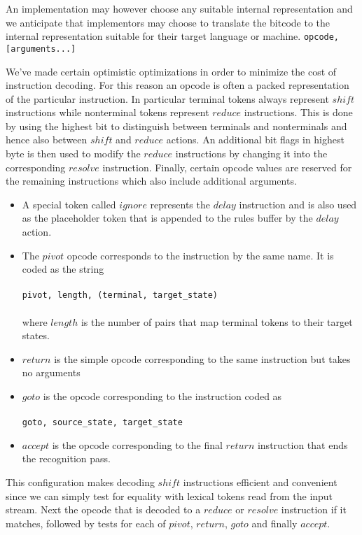 \documentclass[11pt]{article}
\begin{document}
An implementation may however choose any suitable internal representation and we anticipate that implementors may choose to translate the bitcode to the internal representation suitable for their target language or machine.
\texttt{opcode, [arguments...]}

We've made certain optimistic optimizations in order to minimize the cost of instruction decoding. 
For this reason an opcode is often a packed representation of the particular instruction.
In particular terminal tokens always represent $shift$ instructions while nonterminal tokens represent $reduce$ instructions.
This is done by using the highest bit to distinguish between terminals and nonterminals and hence also between $shift$ and $reduce$ actions.
An additional bit flags in highest byte is then used to modify the  $reduce$ instructions by changing it into the corresponding $resolve$ instruction.
Finally, certain opcode values are reserved for the remaining instructions which also include additional arguments.

\begin{itemize}
\item A special token called $ignore$ represents the $delay$ instruction and is also used as the placeholder token that is appended to the rules buffer by the $delay$ action.
\item The $pivot$ opcode corresponds to the instruction by the same name. It is coded as the string\\\\
      \texttt{pivot, length, (terminal, target\_state)\*}\\\\
      where $length$ is the number of pairs that map terminal tokens to their target states.
\item $return$ is the simple opcode corresponding to the same instruction but takes no arguments
\item $goto$ is the opcode corresponding to the instruction coded as\\\\
      \texttt{goto, source\_state, target\_state}\\
\item $accept$ is the opcode corresponding to the final $return$ instruction that ends the recognition pass.
\end{itemize}

This configuration makes decoding $shift$ instructions efficient and convenient since we can simply test for equality with lexical tokens read from the input stream. 
Next the opcode that is decoded to a $reduce$ or $resolve$ instruction if it matches, followed by tests for each of $pivot$, $return$, $goto$ and finally $accept$.
\end{document}
